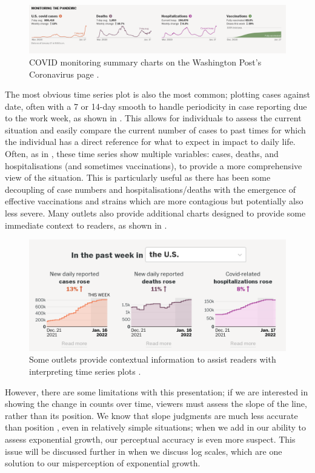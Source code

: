 \documentclass[article]{jdssv}\usepackage[]{graphicx}\usepackage[]{color}
\begin{document}
\begin{figure}
\centering
\includegraphics[width=.99\linewidth]{wapo-COVID-monitoring}
\caption{COVID monitoring summary charts on the Washington Post's Coronavirus page \citep{Coronavirus2022}.}
\label{fig:wapo-COVID-time-series}
\end{figure}

The most obvious time series plot is also the most common; plotting cases against date, often with a 7 or 14-day smooth to handle periodicity in case reporting due to the work week, as shown in . This allows for individuals to assess the current situation and easily compare the current number of cases to past times for which the individual has a direct reference for what to expect in impact to daily life. Often, as in , these time series show multiple variables: cases, deaths, and hospitalisations (and sometimes vaccinations), to provide a more comprehensive view of the situation. This is particularly useful as there has been some decoupling of case numbers and hospitalisations/deaths with the emergence of effective vaccinations and strains which are more contagious but potentially also less severe. Many outlets also provide additional charts designed to provide some immediate context to readers, as shown in . 

\begin{figure}
\centering
\includegraphics[width=.5\linewidth]{wapo-COVID-context}
\caption{Some outlets provide contextual information to assist readers with interpreting time series plots \citep{CoronavirusCasesTracking2022}.}
\label{fig:wapo-context}
\end{figure}

However, there are some limitations with this presentation; if we are interested in showing the change in counts over time, viewers must assess the slope of the line, rather than its position. We know that slope judgments are much less accurate than position \citep{clevelandGraphicalPerceptionVisual1987}, even in relatively simple situations; when we add in our ability to assess exponential growth, our perceptual accuracy is even more suspect. This issue will be discussed further in  when we discuss log scales, which are one solution to our misperception of exponential growth.
\end{document}
